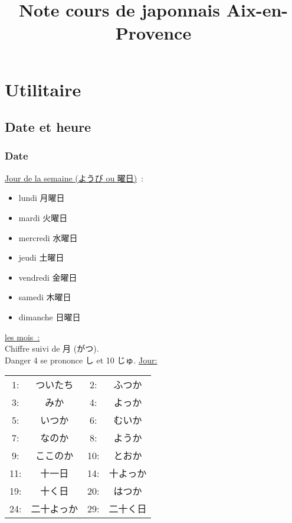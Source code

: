 \documentclass{article}
\title{Note cours de japonnais Aix-en-Provence}
\begin{document}
  \maketitle
\tableofcontents

\section{Utilitaire}
    \subsection{Date et heure}
\begin{CJK}{UTF8}{min}
    \subsubsection{Date}
    \underline{Jour de la semaine (ようび ou 曜日)}~:\\
    \begin{itemize}
        \item lundi 月曜日
        \item mardi 火曜日
        \item mercredi 水曜日
        \item jeudi 土曜日
        \item vendredi 金曜日
        \item samedi 木曜日
        \item dimanche 日曜日
    \end{itemize}
    \underline{les mois~:}\\
    Chiffre suivi de 月 (がつ). \\
    Danger 4 se prononce し et 10 じゅ.
    \underline{Jour:}\\
\begin{center}
  \begin{tabular}{| c | c | c | c |}
    \hline
         1:    &ついたち &
         2:    &ふつか\\ 
         3:    &みか  &
         4:    &よっか\\
         5:    &いつか&
         6:    &むいか\\
         7:    &なのか&
         8:    &ようか\\
         9:    &ここのか &
         10:   &とおか\\
         11:   &十一日 &
         14:   &十よっか \\
         19:   &十く日 &
         20:   &はつか\\
         24:   &二十よっか& 
         29:   &二十く日\\

    \hline
  \end{tabular}
\end{center}
\end{CJK}
\end{document}
